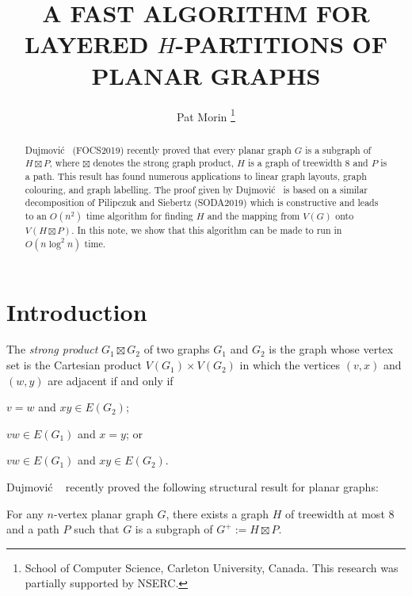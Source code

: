 \documentclass[kpfonts]{patmorin}
\title{\MakeUppercase{A Fast Algorithm for Layered $H$-Partitions of Planar Graphs}}
\author{
  Pat Morin%
    \thanks{School of Computer Science, Carleton University, Canada. This research was partially supported by NSERC.}
}
\begin{document}
\maketitle

\begin{abstract}
  Dujmović \etal\  (FOCS2019) recently proved that every planar graph $G$ is a subgraph of $H\boxtimes P$, where $\boxtimes$ denotes the strong graph product, $H$ is a graph of treewidth 8 and $P$ is a path.  This result has found numerous applications to linear graph layouts, graph colouring, and graph labelling.  The proof given by Dujmović \etal\  is based on a similar decomposition of Pilipczuk and Siebertz (SODA2019) which is constructive and leads to an $O(n^2)$ time algorithm for finding $H$ and the mapping from $V(G)$ onto $V(H\boxtimes P)$.  In this note, we show that this algorithm can be made to run in $O(n\log^2 n)$ time.
\end{abstract}

\section{Introduction}

The \emph{strong product} $G_1\boxtimes G_2$ of two graphs $G_1$ and $G_2$ is the graph whose vertex set is the Cartesian product $V(G_1)\times V(G_2)$ in which the vertices $(v,x)$ and $(w,y)$ are adjacent if and only if
\begin{compactitem}
  \item $v=w$ and $xy\in E(G_2)$;
  \item $vw\in E(G_1)$ and $x=y$; or
  \item $vw\in E(G_1)$ and $xy\in E(G_2)$.
\end{compactitem}
Dujmović \etal\  \cite{dujmovic.joret.ea:planar} recently proved the following structural result for planar graphs:

\begin{thm}
  For any $n$-vertex planar graph $G$, there exists a graph $H$ of treewidth at most 8 and a path $P$ such that $G$ is a subgraph of $G^+:=H\boxtimes P$.
\end{thm}
\end{document}
